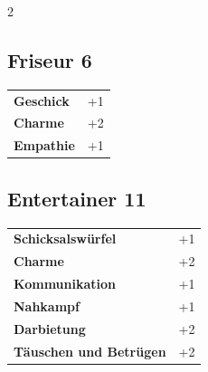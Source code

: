 \begin{multicols}{2}
\begin{tcolorbox}

\end{tcolorbox}

\begin{tcolorbox}
    \subsection*{Friseur \hfill \small{6 }}
    \tcblower




\begin{tabular}{@{}ll@{}}
    \textbf{Geschick} & +1\\
    \textbf{Charme} & +2\\
    \textbf{Empathie} & +1\\
\end{tabular}


\end{tcolorbox}

\begin{tcolorbox}
    \subsection*{Entertainer \hfill \small{11 }}
    \tcblower




\begin{tabular}{@{}ll@{}}
    \textbf{Schicksalswürfel} & +1\\
    \textbf{Charme} & +2\\
    \textbf{Kommunikation} & +1\\
    \textbf{Nahkampf} & +1\\
    \textbf{Darbietung} & +2\\
    \textbf{Täuschen und Betrügen} & +2\\
\end{tabular}


\end{tcolorbox}
\end{multicols}
